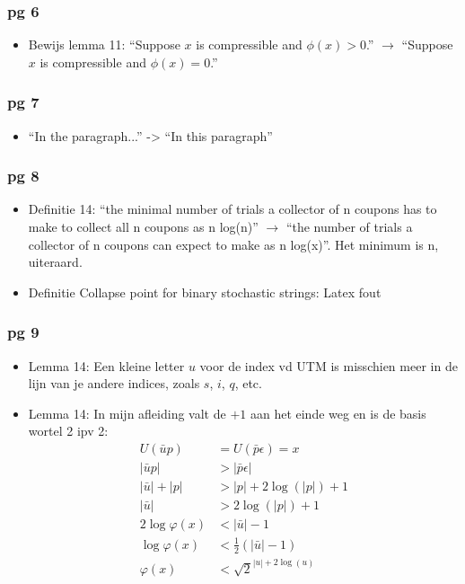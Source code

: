 \documentclass{article}
\theoremstyle{definition}
\begin{document}
\subsubsection*{pg 6}
\begin{itemize}

  \item      Bewijs lemma 11: ``Suppose $x$ is compressible and $\phi(x) > 0$.''  $\rightarrow$  ``Suppose $x$ is compressible and $\phi(x) = 0$.''
\end{itemize}

\subsubsection*{pg 7}
\begin{itemize}


  \item      ``In the paragraph...'' -> ``In this paragraph''
\end{itemize}

\subsubsection*{pg 8}
\begin{itemize}

  \item      Definitie 14: ``the minimal number of trials a collector of n coupons has to make to collect all n coupons as n log(n)''  $\rightarrow$  ``the number of trials a collector of n coupons can expect to make as n log(x)''. Het minimum is n, uiteraard.
  \item      Definitie Collapse point for binary stochastic strings: Latex fout
\end{itemize}

\subsubsection*{pg 9}
\begin{itemize}

  \item      Lemma 14: Een kleine letter $u$ voor de index vd UTM is misschien meer in de lijn van je andere indices, zoals $s$, $i$, $q$, etc.
  \item      Lemma 14: In mijn afleiding valt de $+ 1$ aan het einde weg en is de basis wortel 2 ipv 2:
\begin{align*}
		U(\bar{u}p) &= U(\bar{p}\epsilon) = x \\
        |\bar{u}p| &> |\bar{p}\epsilon| \\
        |\bar{u}| + |p| &> |p| + 2 \log (|p|) + 1 \\
        |\bar{u}| &> 2 \log(|p|) + 1 \\
        2\log\varphi(x) &< |\bar{u}| - 1 \\
		\log\varphi(x) &< \frac{1}{2}(|\bar{u}| - 1) \\
		\varphi(x) &< \sqrt{2}^{|u| + 2\log(u)}  
\end{align*}
\end{itemize}
\end{document}
